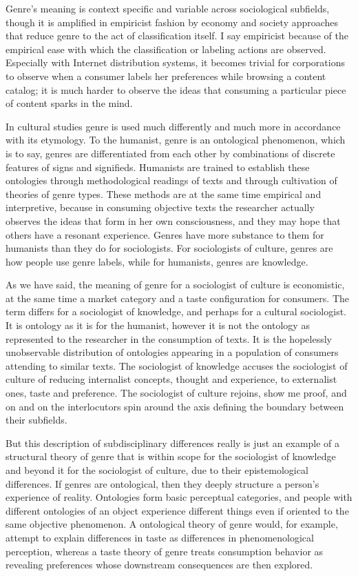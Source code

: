 \documentclass[]{book}
\theoremstyle{definition}
\theoremstyle{definition}
\theoremstyle{definition}
\theoremstyle{remark}
\begin{document}
Genre's meaning is context specific and variable across sociological
subfields, though it is amplified in empiricist fashion by economy and
society approaches that reduce genre to the act of classification
itself. I say empiricist because of the empirical ease with which the
classification or labeling actions are observed. Especially with
Internet distribution systems, it becomes trivial for corporations to
observe when a consumer labels her preferences while browsing a content
catalog; it is much harder to observe the ideas that consuming a
particular piece of content sparks in the mind.

In cultural studies genre is used much differently and much more in
accordance with its etymology. To the humanist, genre is an ontological
phenomenon, which is to say, genres are differentiated from each other
by combinations of discrete features of signs and signifieds. Humanists
are trained to establish these ontologies through methodological
readings of texts and through cultivation of theories of genre types.
These methods are at the same time empirical and interpretive, because
in consuming objective texts the researcher actually observes the ideas
that form in her own consciousness, and they may hope that others have a
resonant experience. Genres have more substance to them for humanists
than they do for sociologists. For sociologists of culture, genres are
how people use genre labels, while for humanists, genres are knowledge.

As we have said, the meaning of genre for a sociologist of culture is
economistic, at the same time a market category and a taste
configuration for consumers. The term differs for a sociologist of
knowledge, and perhaps for a cultural sociologist. It is ontology as it
is for the humanist, however it is not the ontology as represented to
the researcher in the consumption of texts. It is the hopelessly
unobservable distribution of ontologies appearing in a population of
consumers attending to similar texts. The sociologist of knowledge
accuses the sociologist of culture of reducing internalist concepts,
thought and experience, to externalist ones, taste and preference. The
sociologist of culture rejoins, show me proof, and on and on the
interlocutors spin around the axis defining the boundary between their
subfields.

But this description of subdisciplinary differences really is just an
example of a structural theory of genre that is within scope for the
sociologist of knowledge and beyond it for the sociologist of culture,
due to their epistemological differences. If genres are ontological,
then they deeply structure a person's experience of reality. Ontologies
form basic perceptual categories, and people with different ontologies
of an object experience different things even if oriented to the same
objective phenomenon. A ontological theory of genre would, for example,
attempt to explain differences in taste as differences in
phenomenological perception, whereas a taste theory of genre treats
consumption behavior as revealing preferences whose downstream
consequences are then explored.
\end{document}
